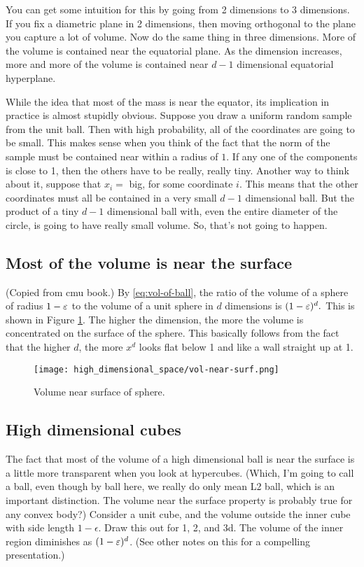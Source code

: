 You can get some intuition for this by going from 2 dimensions to 3 dimensions. If you fix a diametric plane in 2 dimensions, then moving orthogonal to the plane you capture a lot of volume. Now do the same thing in three dimensions. More of the volume is contained near the equatorial plane. As the dimension increases, more and more of the volume is contained near $d-1$ dimensional equatorial hyperplane. 

While the idea that most of the mass is near the equator, its implication in practice is almost stupidly obvious. Suppose you draw a uniform random sample from the unit ball. Then with high probability, all of the coordinates are going to be small. This makes sense when you think of the fact that the norm of the sample must be contained near within a radius of $1$. If any one of the components is close to 1, then the others have to be really, really tiny. Another way to think about it, suppose that $x_i = $ big, for some coordinate $i$. This means that the other coordinates must all be contained in a very small $d-1$ dimensional ball. But the product of a tiny $d-1$ dimensional ball with, even the entire diameter of the circle, is going to have really small volume. So, that's not going to happen. 

\subsection{Most of the volume is near the surface}
(Copied from cmu book.) By \eqref{eq:vol-of-ball}, the ratio of the volume of a sphere of radius $1-\varepsilon$ to the volume of a unit sphere in $d$ dimensions is $
(1-\varepsilon)^d.$
This is shown in Figure \ref{fig:vol-near-surf}. 
The higher the dimension, the more the volume is concentrated on the surface of the sphere. This basically follows from the fact that the higher $d$, the more $x^d$ looks flat below 1 and like a wall straight up at 1. 
\begin{figure} \label{fig:vol-near-surf}
\centering
\texttt{[image: high\_dimensional\_space/vol-near-surf.png]}
\caption{Volume near surface of sphere.}
\end{figure}

\subsection{High dimensional cubes}
The fact that most of the volume of a high dimensional ball is near the surface is a little more transparent when you look at hypercubes. (Which, I'm going to call a ball, even though by ball here, we really do only mean L2 ball, which is an important distinction. The volume near the surface property is probably true for any convex body?) 
Consider a unit cube, and the volume outside the inner cube with side length $1-\epsilon$. Draw this out for 1, 2, and 3d. The volume of the inner region diminishes as $(1-\varepsilon)^d$. (See other notes on this for a compelling presentation.) 


